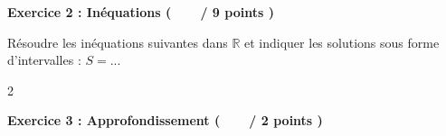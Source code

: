 \documentclass[12pt,a4paper]{exam}
\begin{document}
\vspace{0.5cm}

\noindent
\textbf{Exercice 2 : Inéquations (\ \ \ \  / 9 points )}
\vspace{5pt}

\begin{questions}

\question[4] Résoudre les inéquations suivantes dans $\mathbb{R}$ et indiquer les solutions sous forme d'intervalles : $S = ...$
\begin{multicols}{2}
    \begin{parts}
        \part $8x + 3 > 3x - 5$
        \textcolor{red}{$S = \left]-\dfrac{8}{5}; +\infty\right[$}

        \part $-3x \geq 3x - 1$
        \textcolor{red}{$S = \left]-\infty; \dfrac{1}{6}\right]$}
    \end{parts}
\end{multicols}
    \begin{parts}
        \setcounter{partno}{2}
        \part $(1-2x)(4x+2) \leq 0$
        \textcolor{red}{$S = \left]-\infty; -\dfrac{1}{2}\right] \cup \left[\dfrac{1}{2}; +\infty\right[$}

        \part $\dfrac{-8x+16}{2x} < 0$
        \textcolor{red}{$S = \left]-\infty; 0\right[ \cup \left]2; +\infty\right[$}
    \end{parts}

\end{questions}

\vspace{10pt}

\noindent
\textbf{Exercice 3 : Approfondissement (\ \ \ \  / 2 points )}
\vspace{5pt}
\end{document}
